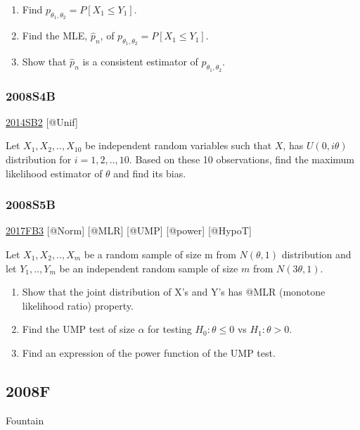 \documentclass[6pt,twocolumn,Portrait]{article}
\begin{document}
\begin{enumerate}
\def\labelenumi{(\alph{enumi})}
\item
  Find \(p_{\theta_1,\theta_2}= P[X_1\le Y_1]\).
\item
  Find the MLE, \(\hat p_n\), of
  \(p_{\theta_1,\theta_2}= P[X_1\le Y_1]\).
\item
  Show that \(\hat p_n\) is a consistent estimator of
  \(p_{\theta_1,\theta_2}\).
\end{enumerate}

\hypertarget{s4b}{%
\subsubsection{2008S4B}\label{s4b}}

\protect\hyperlink{sb2-2}{2014SB2} {[}@Unif{]}

Let \(X_1,X_2,..,X_{10}\) be independent random variables such that
\(X\), has \(U(0,i\theta)\) distribution for \(i= 1,2,..,10\). Based on
these 10 observations, find the maximum likelihood estimator of
\(\theta\) and find its bias.

\hypertarget{s5b}{%
\subsubsection{2008S5B}\label{s5b}}

\protect\hyperlink{fb3-3}{2017FB3} {[}@Norm{]} {[}@MLR{]} {[}@UMP{]}
{[}@power{]} {[}@HypoT{]}

Let \(X_1,X_2,..,X_m\) be a random sample of size m from \(N(\theta,1)\)
distribution and let \(Y_1,..,Y_m\) be an independent random sample of
size \(m\) from \(N(3\theta,1)\).

\begin{enumerate}
\def\labelenumi{(\alph{enumi})}
\item
  Show that the joint distribution of X's and Y's has @MLR (monotone
  likelihood ratio) property.
\item
  Find the UMP test of size \(\alpha\) for testing \(H_0:\theta\le0\) vs
  \(H_1:\theta>0\).
\item
  Find an expression of the power function of the UMP test.
\end{enumerate}

\hypertarget{f-4}{%
\subsection{2008F}\label{f-4}}

Fountain
\end{document}

